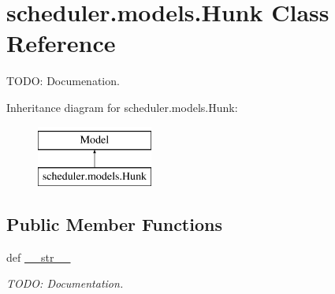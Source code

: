 \hypertarget{classscheduler_1_1models_1_1_hunk}{\section{scheduler.\-models.\-Hunk Class Reference}
\label{classscheduler_1_1models_1_1_hunk}
}


T\-O\-D\-O\-: Documenation.  


Inheritance diagram for scheduler.\-models.\-Hunk\-:\begin{figure}[H]
\begin{center}
\leavevmode
\includegraphics[height=2.000000cm]{classscheduler_1_1models_1_1_hunk}
\end{center}
\end{figure}
\subsection*{Public Member Functions}
\begin{DoxyCompactItemize}
\item 
\hypertarget{classscheduler_1_1models_1_1_hunk_a0ea2e3fef6321aa3e738390c537defde}{def \hyperlink{classscheduler_1_1models_1_1_hunk_a0ea2e3fef6321aa3e738390c537defde}{\-\_\-\-\_\-str\-\_\-\-\_\-}}\label{classscheduler_1_1models_1_1_hunk_a0ea2e3fef6321aa3e738390c537defde}

\begin{DoxyCompactList}\small\item\em T\-O\-D\-O\-: Documentation. \end{DoxyCompactList}\end{DoxyCompactItemize}
